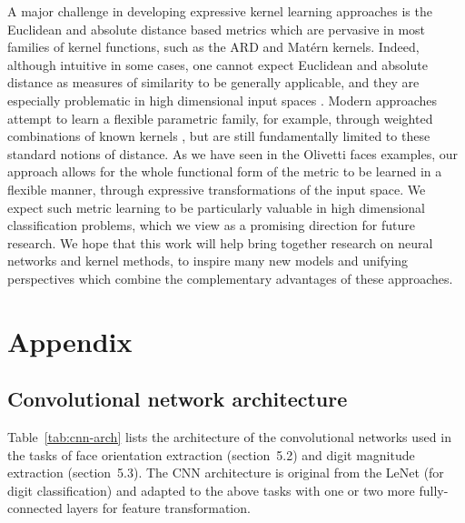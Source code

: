 \documentclass[twoside,11pt]{article}
\begin{document}
A major challenge in developing expressive kernel learning approaches is the Euclidean and absolute distance based metrics which are pervasive in most families of kernel functions, such as the ARD and Mat\'{e}rn kernels.  Indeed, although intuitive in some cases, one cannot expect Euclidean and absolute distance as measures of similarity to be generally applicable, and they are especially problematic in high dimensional input spaces \citep{aggarwal2001surprising}.  Modern approaches attempt to learn a flexible parametric family, for example, through weighted combinations of known kernels \citep[e.g.,][]{gonen2011}, but are still fundamentally limited to these standard notions of distance.
As we have seen in the Olivetti faces examples, our approach allows for the whole functional form of the metric to be learned in a flexible manner, through expressive transformations of the input space.  We expect such metric learning to be particularly valuable in high dimensional classification problems, which we view as a promising direction for future research. We hope that this work will help bring together research on neural networks and kernel methods, to inspire many new models and unifying perspectives which combine the complementary advantages of these approaches.

{


}


\clearpage{}\newpage{}
\appendix

\section{Appendix}

\subsection{Convolutional network architecture}

Table~\ref{tab:cnn-arch} lists the architecture of the convolutional networks used in the tasks of face orientation extraction (section~5.2) and digit magnitude extraction (section~5.3). The CNN architecture is original from the LeNet \cite{lecun1998gradient} (for digit classification) and adapted to the above tasks with one or two more fully-connected layers for feature transformation.
\end{document}
